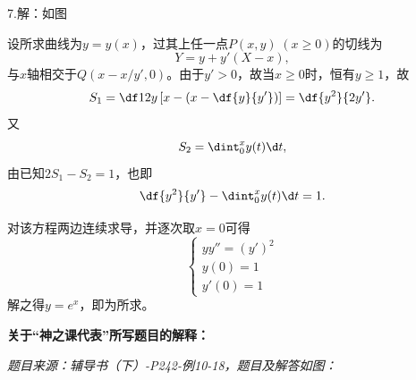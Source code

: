 7.\;解：如图
\begin{center}
\end{center}
设所求曲线为$y=y(x)$，过其上任一点$P(x,y)\;(x\geq 0)$的切线为
$$Y=y+y'(X-x),$$
与$x$轴相交于$Q(x-x/y',0)$。由于$y'>0$，故当$x\geq 0$时，恒有$y\geq 1$，故
$$S_1=\df12y\left[x-\left(x-\df{y}{y'}\right)\right]=\df{y^2}{2y'}.$$
又
$$S_2=\dint_0^xy(t)\d t,$$
由已知$2S_1-S_2=1$，也即
$$\df{y^2}{y'}-\dint_0^xy(t)\d t=1.$$

对该方程两边连续求导，并逐次取$x=0$可得
$$\left\{\begin{array}{l}
yy''=(y')^2\\
y(0)=1\\
y'(0)=1
\end{array}\right.$$
解之得$y=e^x$，即为所求。


\ifvisible

	\newpage
	
	{\bf 关于“神之课代表”所写题目的解释：}
	
	{\it 题目来源：辅导书（下）-P242-例10-18，题目及解答如图：}
	
